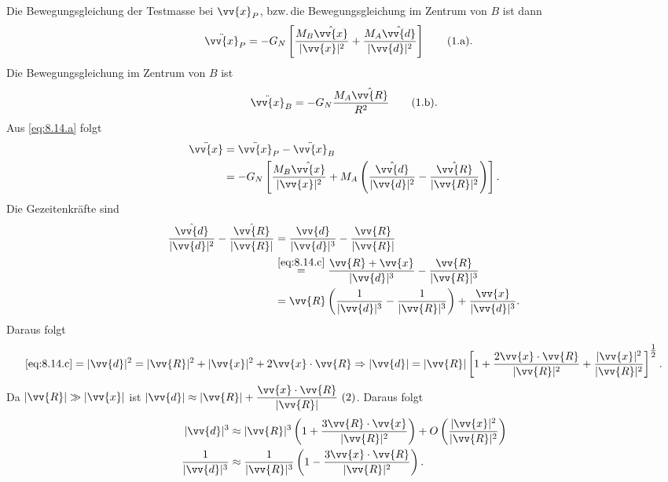 \documentclass[a4paper,12pt]{article}
\newcommand\inlineeqno{\stepcounter{equation}\ {(\theequation)}}
\newcommand\inlineeqnowoa{\theequation.\text{a}}
\newcommand\inlineeqnowob{\theequation.\text{b}}
\numberwithin{equation}{section}
\begin{document}
Die Bewegungsgleichung der Testmasse bei $\vv{x}_P$, bzw.\,die Bewegungsgleichung im Zentrum von $B$ ist dann
\begin{align*}
        \ddot{\vv{x}}_P&=-G_N\left[\dfrac{M_B\hat{\vv{x} }}{|\vv{x}|^2}+\dfrac{M_A\hat{\vv{d} }}{|\vv{d}|^2}\right]\stepcounter{equation}\tag{\inlineeqnowoa}\label{eq:8.15.a}
.\end{align*} 
Die Bewegungsgleichung im Zentrum von $B$ ist 
\begin{align} 
        \ddot{\vv{x}}_B=-G_N\dfrac{M_A\hat{\vv{R} }}{R^2}\tag{\inlineeqnowob}\label{eq:8.15.b} 
.\end{align} 
Aus \eqref{eq:8.14.a} folgt
\begin{align} 
        \ddot{\vv{x}}&=\ddot{\vv{x}}_P-\ddot{\vv{x}}_B\nonumber \\
                     &=-G_N\left[\dfrac{M_B\hat{\vv{x} }}{|\vv{x}|^2}+M_A\left(\dfrac{\hat{\vv{d} }}{|\vv{d}|^2}-\dfrac{\hat{\vv{R} }}{|\vv{R}|^2}\right)\right]\label{eq:8.16}
.\end{align} 
Die Gezeitenkräfte sind
\begin{align} 
        \dfrac{\hat{\vv{d} }}{|\vv{d}|^2}-\dfrac{\hat{\vv{R} }}{|\vv{R}|}&=\dfrac{\vv{d}}{|\vv{d}|^3}-\dfrac{\vv{R}}{|\vv{R}|}\nonumber \\
                                                                       &\stackrel{\eqref{eq:8.14.c}}{=}\dfrac{\vv{R}+\vv{x}}{|\vv{d}|^3}-\dfrac{\vv{R}}{|\vv{R}|^3}\nonumber \\
                                                                       &=\vv{R}\left(\dfrac{1}{|\vv{d}|^3}-\dfrac{1}{|\vv{R}|^3}\right)+\dfrac{\vv{x}}{|\vv{d}|^3}\label{eq:8.17}
.\end{align} 
Daraus folgt
\begin{align*} 
        \eqref{eq:8.14.c}=|\vv{d}|^2=|\vv{R}|^2+|\vv{x}|^2+2\vv{x}\cdot \vv{R}\Rightarrow |\vv{d}|=|\vv{R}|\left[1+\dfrac{2\vv{x}\cdot \vv{R}}{|\vv{R}|^2}+\dfrac{|\vv{x}|^2}{|\vv{R}|^2}\right]^{\tfrac{1}{2}}
.\end{align*} 
Da $|\vv{R}|\gg |\vv{x}|$ ist $|\vv{d}|\approx |\vv{R}|+\dfrac{\vv{x}\cdot \vv{R}}{|\vv{R}|}\inlineeqno\label{eq:8.18}$. Daraus folgt
\begin{align} 
        |\vv{d}|^3&\approx |\vv{R}|^3\left(1+\dfrac{3\vv{R}\cdot \vv{x}}{|\vv{R}|^2}\right)+O\left(\dfrac{|\vv{x}|^2}{|\vv{R}|^2}\right)\nonumber \\
        \dfrac{1}{|\vv{d}|^3}&\approx \dfrac{1}{|\vv{R}|^3}\left(1-\dfrac{3\vv{x}\cdot \vv{R}}{|\vv{R}|^2}\right)\label{eq:8.19}
.\end{align} 
\end{document}

